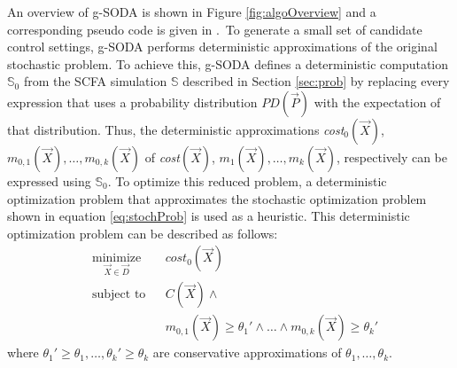 \documentclass[a4paper, 12pt]{article} %
\begin{document}
An overview of g-SODA is shown in Figure \ref{fig:algoOverview} and a corresponding pseudo code is given in \algoSODAm.~To generate a small set of candidate control settings, g-SODA performs deterministic approximations of the original stochastic problem. 
To achieve this, g-SODA defines a deterministic computation $\mathbb{S}_0$ from the SCFA simulation $\mathbb{S}$ described in Section \ref{sec:prob} by replacing every expression that uses a probability distribution $PD(\vec{P})$ with the expectation of that distribution. 
Thus, the deterministic approximations \textit{cost$_0$}$(\vec{X})$, $m_{0,1}(\vec{X}),\dots,m_{0,k}(\vec{X})$ of \textit{cost}$(\vec{X})$, $m_1(\vec{X}),\dots,m_k(\vec{X})$, respectively can be expressed using $\mathbb{S}_0$.
To optimize this reduced problem, a deterministic optimization problem that approximates the stochastic optimization problem shown in equation \ref{eq:stochProb} is used as a heuristic. This deterministic optimization problem can be described as follows:
\begin{equation}
\label{eq:detApprox}
\begin{aligned}
& \underset{\vec{X}\in\vec{D}}{\text{minimize}}
& & \textit{cost}_0(\vec{X}) \\
& \text{subject to}
& & C(\vec{X}) \wedge \\
&&& m_{0,1}(\vec{X})\ge  \theta_1{'}\wedge\dots \wedge m_{0,k}(\vec{X})\ge  \theta_k{'} 
\end{aligned}
\end{equation}
where $\theta_1{'} \ge \theta_1,\dots,\theta_k{'} \ge \theta_k$ are conservative approximations of $\theta_1,\dots,\theta_k$. 
\end{document}
